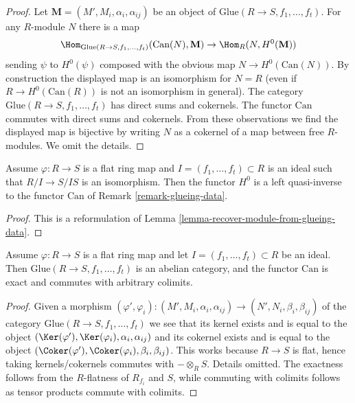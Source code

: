 \begin{proof}
Let $\mathbf{M} = (M', M_i, \alpha_i, \alpha_{ij})$ be an object of
$\text{Glue}(R \to S, f_1, \ldots, f_t)$. For any $R$-module $N$ there is
a map
$$
\Hom_{\text{Glue}(R \to S, f_1, \ldots, f_t)}(\text{Can}(N), \mathbf{M})
\to
\Hom_R(N, H^0(\mathbf{M}))
$$
sending $\psi$ to $H^0(\psi)$ composed with the obvious map
$N \to H^0(\text{Can}(N))$. By construction the displayed map is an isomorphism
for $N = R$ (even if $R \to H^0(\text{Can}(R))$ is not an isomorphism
in general). The category $\text{Glue}(R \to S, f_1, \ldots, f_t)$ has
direct sums and cokernels. The functor $\text{Can}$ commutes with direct sums
and cokernels. From these observations we find the displayed map is bijective
by writing $N$ as a cokernel of a map between free $R$-modules.
We omit the details.
\end{proof}

\begin{lemma}
\label{lemma-H0-inverse}
Assume $\varphi : R \to S$ is a flat ring map and
$I = (f_1, \ldots, f_t) \subset R$ is an ideal such that
$R/I \to S/IS$ is an isomorphism. Then the functor $H^0$
is a left quasi-inverse to the functor $\text{Can}$ of
Remark \ref{remark-glueing-data}.
\end{lemma}

\begin{proof}
This is a reformulation of
Lemma \ref{lemma-recover-module-from-glueing-data}.
\end{proof}

\begin{lemma}
\label{lemma-exact}
Assume $\varphi : R \to S$ is a flat ring map and let
$I = (f_1, \ldots, f_t) \subset R$ be an ideal.
Then $\text{Glue}(R \to S, f_1, \ldots, f_t)$ is an abelian category, and
the functor $\text{Can}$ is exact and commutes with arbitrary colimits.
\end{lemma}

\begin{proof}
Given a morphism
$(\varphi', \varphi_i) :
(M', M_i, \alpha_i, \alpha_{ij})
\to
(N', N_i, \beta_i, \beta_{ij})$
of the category $\text{Glue}(R \to S, f_1, \ldots, f_t)$
we see that its kernel exists and is equal to the object
$(\Ker(\varphi'), \Ker(\varphi_i), \alpha_i, \alpha_{ij})$
and its cokernel exists and is equal to the object
$(\Coker(\varphi'), \Coker(\varphi_i), \beta_i, \beta_{ij})$.
This works because $R \to S$ is flat, hence taking kernels/cokernels
commutes with $- \otimes_R S$. Details omitted.
The exactness follows from the $R$-flatness of $R_{f_i}$ and $S$, while
commuting with colimits follows as tensor products commute with colimits.
\end{proof}


